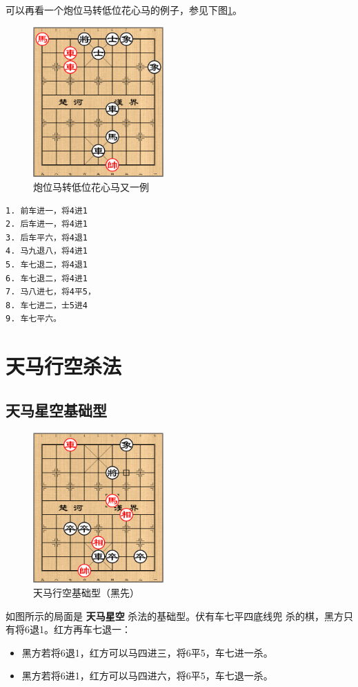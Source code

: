 \documentclass[a5paper,twoside]{book}
\begin{document}
可以再看一个炮位马转低位花心马的例子，参见下图\ref{pwmzdwhxmyyl}。

\begin{figure}[H]
\centering
\includegraphics[width=5cm]{pic/炮位马转低位花心马又一例.png}
\caption{\label{pwmzdwhxmyyl}炮位马转低位花心马又一例}
\end{figure}

\begin{verbatim}
1. 前车进一，将4进1
2. 后车进一，将4进1
3. 后车平六，将4退1
4. 马九退八，将4进1
5. 车七退二，将4退1
6. 车七退二，将4进1
7. 马八进七，将4平5，
8. 车七进二，士5进4
9. 车七平六。
\end{verbatim}

\section{天马行空杀法}
\label{sec-5-2}

\subsection{天马星空基础型}
\label{sec-5-2-1}
\begin{figure}[H]
\centering
\includegraphics[width=5cm]{pic/天马行空基础型.png}
\caption{天马行空基础型（黑先）}
\end{figure}

如图所示的局面是 \textbf{天马星空} 杀法的基础型。伏有车七平四底线兜
杀的棋，黑方只有将6退1。红方再车七退一：
\begin{itemize}
\item 黑方若将6退1，红方可以马四进三，将6平5，车七进一杀。
\item 黑方若将6进1，红方可以马四进六，将6平5，车七退一杀。
\end{itemize}
\end{document}
